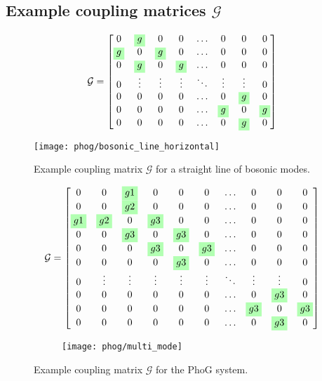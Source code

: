 \subsection{Example coupling matrices $\mathcal{G}$}
\begin{figure}[htp]
\captionsetup{width=0.8\linewidth}
\begin{minipage}{.8\textwidth}
\[
\mathcal{G} = 
\begin{bmatrix}
0 & \highlight{g} & 0 & 0 & \dots & 0 & 0 & 0 \\
\highlight{g} & 0 & \highlight{g} & 0 & \dots & 0 & 0 & 0 \\
0 & \highlight{g} & 0 & \highlight{g} & \dots & 0 & 0 & 0  \\
0 & \vdots & \vdots & \vdots & \ddots & \vdots & \vdots & 0 \\
0 & 0 & 0 & 0 & \dots & 0 & \highlight{g} & 0 \\
0 & 0 & 0 & 0 & \dots & \highlight{g} & 0 & \highlight{g} \\
0 & 0 & 0 & 0 & \dots & 0 & \highlight{g} & 0
\end{bmatrix}
\]
\end{minipage}
\begin{minipage}{.8\textwidth}
\centering
\texttt{[image: phog/bosonic\_line\_horizontal]}
\end{minipage}
\caption{\label{fig:coupline} Example coupling matrix $\mathcal{G}$ for a straight line of bosonic modes.}
\end{figure}



\begin{figure}[htp]
\begin{minipage}{.8\textwidth}
\[
\mathcal{G} = 
\begin{bmatrix}
0 & 0 & \highlight{g1} & 0 & 0 & 0 & \dots & 0 & 0 & 0 \\
0 & 0 & \highlight{g2} & 0 & 0 & 0 & \dots & 0 & 0 & 0 \\
\highlight{g1} & \highlight{g2} & 0 & \highlight{g3} & 0 & 0 & \dots & 0 & 0 & 0 \\
0 & 0 & \highlight{g3} & 0 & \highlight{g3} & 0 & \dots & 0 & 0 & 0 \\
0 & 0 & 0 & \highlight{g3} & 0 & \highlight{g3} & \dots & 0 & 0 & 0 \\
0 & 0 & 0 & 0 & \highlight{g3} & 0 & \dots & 0 & 0 & 0  \\
0 & \vdots & \vdots & \vdots & \vdots & \vdots & \ddots & \vdots & \vdots & 0 \\
0 & 0 & 0 & 0 & 0 & 0 & \dots & 0 & \highlight{g3} & 0 \\
0 & 0 & 0 & 0 & 0 & 0 & \dots & \highlight{g3} & 0 & \highlight{g3} \\
0 & 0 & 0 & 0 & 0 & 0 & \dots & 0 & \highlight{g3} & 0 
\end{bmatrix}
\]
\end{minipage}
\begin{subfigure}{.8\textwidth}
\centering
\texttt{[image: phog/multi\_mode]}
\end{subfigure}
\caption{\label{fig:coupPhoG} Example coupling matrix $\mathcal{G}$ for the PhoG system.}
\end{figure}
\clearpage
